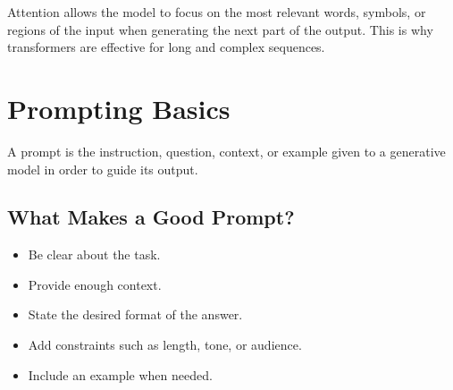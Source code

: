 \documentclass[11pt,a4paper]{article}
\begin{document}
\begin{conceptbox}[Attention]
Attention allows the model to focus on the most relevant words, symbols, or regions of the input when generating the next part of the output. This is why transformers are effective for long and complex sequences.
\end{conceptbox}

\begin{center}
\end{center}

\section{Prompting Basics}

\begin{definitionbox}[Prompt]
A prompt is the instruction, question, context, or example given to a generative model in order to guide its output.
\end{definitionbox}

\subsection{What Makes a Good Prompt?}

\begin{itemize}[leftmargin=*]
  \item Be clear about the task.
  \item Provide enough context.
  \item State the desired format of the answer.
  \item Add constraints such as length, tone, or audience.
  \item Include an example when needed.
\end{itemize}
\end{document}

